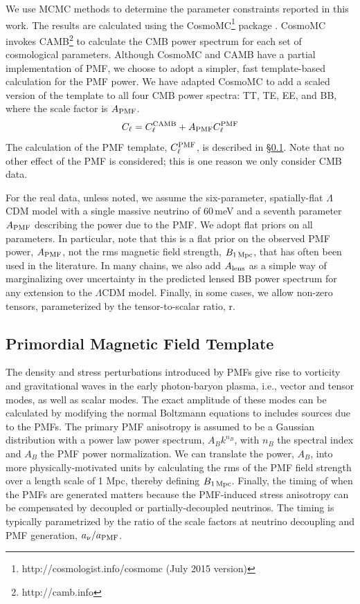 \documentclass[apj]{emulateapj}
\newcommand{\cpmf}{\ensuremath{C_{\ell}^{\rm PMF}}}
\newcommand{\apmf}{\ensuremath{A_{\rm PMF}}}
\newcommand{\bpmf}{\ensuremath{B_{\rm 1\,Mpc}}}
\newcommand{\alens}{\ensuremath{A_{\rm lens}}}
\newcommand{\lcdm}{\ensuremath{\Lambda}CDM}
\newcommand{\be}{\begin{equation}}
\newcommand{\ee}{\end{equation}}
\begin{document}
We use MCMC methods to determine the parameter constraints reported in this work. 
The results are calculated using  the {\textsc CosmoMC}\footnote{http://cosmologist.info/cosmomc (July 2015 version)} package \citep{lewis02b}. 
CosmoMC invokes  CAMB\footnote{http://camb.info}  \citep{lewis00} to calculate the CMB power spectrum for each set of cosmological parameters. 
Although CosmoMC and CAMB have a partial implementation of PMF, we choose to adopt a simpler, fast template-based calculation for the PMF power. 
We have adapted CosmoMC to add a scaled version of the template to all four CMB power spectra: TT, TE, EE, and BB, where the scale factor is \apmf. 
\be
C_\ell = C_\ell^{\rm{CAMB}} + \apmf \cpmf
\ee
The calculation of the PMF template, \cpmf, is described in \S\ref{sec:template}. 
Note that no other effect of the PMF is considered; this is one reason we only consider CMB data.

For the real data, unless noted, we assume the six-parameter, spatially-flat \lcdm{} model with a single massive neutrino of 60\,meV and a seventh parameter \apmf{} describing the power due to the PMF. 
We adopt flat priors on all parameters. 
In particular, note that this is a flat prior on the observed PMF power, $\apmf$, not the rms magnetic field strength, \bpmf, that has often been used in the literature. 
In many chains, we also add \alens{} as a simple way of marginalizing over uncertainty in the predicted lensed BB power spectrum for any extension to the \lcdm{} model. 
Finally, in some cases, we allow non-zero tensors, parameterized by the tensor-to-scalar ratio, r. 

\subsection{Primordial Magnetic Field Template}
\label{sec:template}

The density and stress perturbations introduced by PMFs give rise to vorticity and gravitational waves in the early photon-baryon  plasma, i.e., vector and tensor modes, as well as scalar modes. 
The exact amplitude of these modes can be calculated by modifying the normal Boltzmann equations to includes sources due to the PMFs. 
The primary PMF anisotropy is assumed to be a Gaussian distribution with a power law power spectrum, $A_B k^{n_B}$, with $n_B$ the spectral index and $A_B$ the PMF power normalization. 
We can translate the power, $A_B$, into more physically-motivated units by calculating the rms of the PMF field strength over a length scale of 1 \rm{Mpc}, thereby defining \bpmf. 
Finally, the timing of when the PMFs are generated matters because the PMF-induced stress anisotropy can be compensated by decoupled or partially-decoupled neutrinos. 
The timing is typically parametrized by the ratio of the scale factors at neutrino decoupling and PMF generation, $a_{\nu}/a_{\rm{PMF}}$. 
\end{document}
